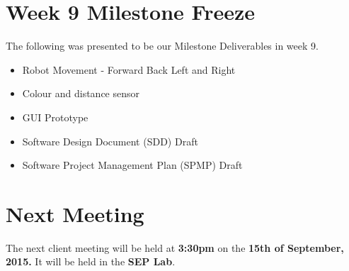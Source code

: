 \documentclass[a4paper]{article}
\begin{document}
\section {Week 9 Milestone Freeze}
The following was presented to be our Milestone Deliverables in week 9.

\begin{itemize}
	\item Robot Movement - Forward Back Left and Right
	\item Colour and distance sensor
	\item GUI Prototype
	\item Software Design Document (SDD) Draft
	\item Software Project Management Plan (SPMP) Draft
\end{itemize}

\section{Next Meeting}
The next client meeting will be held at \textbf{3:30pm} on the \textbf{15th of September, 2015.} It will be held in the \textbf{SEP Lab}.
\end{document}
